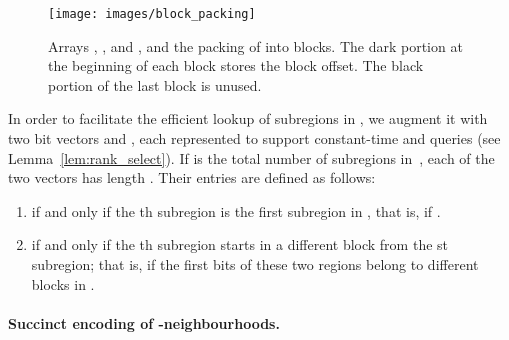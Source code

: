 \begin{figure}[t]
  \centering
  \texttt{[image: images/block\_packing]}
  \caption[Packing graph blocks in memory]{Arrays , , and , 
	and the packing of  into blocks.
    The dark portion at the beginning of each block stores the block offset.
    The black portion of the last block is unused.}
  \label{fig:block-packing}
\end{figure}


In order to facilitate the efficient lookup of subregions in , we augment
it with two bit vectors  and , each represented to support
constant-time  and  queries (see Lemma~\ref{lem:rank_select}).
If  is the total number of subregions in~, each of the two vectors has
length .
Their entries are defined as follows:
\begin{enumerate}
\item  if and only if the th subregion 
  is the first subregion in , that is, if .
\item  if and only if the th subregion starts in
  a different block from the st subregion; that is, if
  the first bits of these two regions belong to different blocks in
  .
\end{enumerate}

\paragraph{\boldmath Succinct encoding of -neighbourhoods.}


